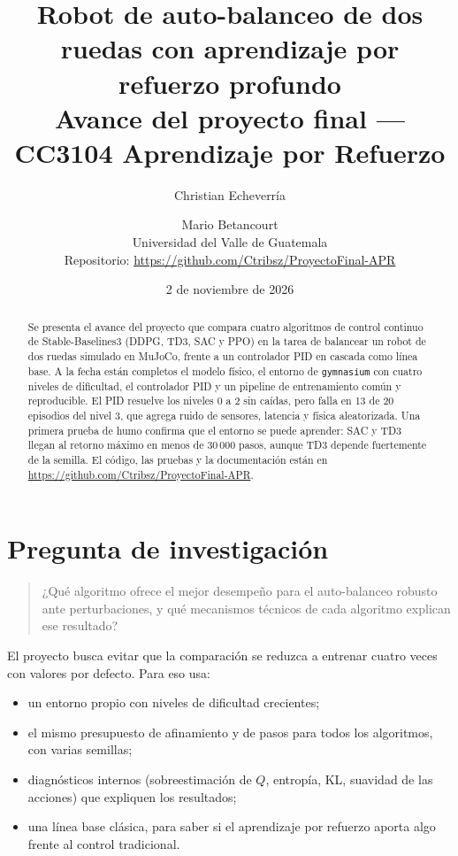 \documentclass[11pt,a4paper]{article}
\title{\textbf{Robot de auto-balanceo de dos ruedas con aprendizaje por refuerzo profundo}\\[4pt]
\large Avance del proyecto final --- CC3104 Aprendizaje por Refuerzo}
\author{Christian Echeverría \and Mario Betancourt\\[2pt]
\small Universidad del Valle de Guatemala\\[2pt]
\small Repositorio: \url{https://github.com/Ctribsz/ProyectoFinal-APR}}
\date{2 de noviembre de 2026}
\newcommand{\code}[1]{\texttt{#1}}
\begin{document}
\maketitle

\begin{abstract}
Se presenta el avance del proyecto que compara cuatro algoritmos de control continuo de Stable-Baselines3 (DDPG, TD3, SAC y PPO) en la tarea de balancear un robot de dos ruedas simulado en MuJoCo, frente a un controlador PID en cascada como línea base. A la fecha están completos el modelo físico, el entorno de \code{gymnasium} con cuatro niveles de dificultad, el controlador PID y un pipeline de entrenamiento común y reproducible. El PID resuelve los niveles 0 a 2 sin caídas, pero falla en 13 de 20 episodios del nivel 3, que agrega ruido de sensores, latencia y física aleatorizada. Una primera prueba de humo confirma que el entorno se puede aprender: SAC y TD3 llegan al retorno máximo en menos de 30\,000 pasos, aunque TD3 depende fuertemente de la semilla. El código, las pruebas y la documentación están en \url{https://github.com/Ctribsz/ProyectoFinal-APR}.
\end{abstract}

\section{Pregunta de investigación}

\begin{quote}
¿Qué algoritmo ofrece el mejor desempeño para el auto-balanceo robusto ante perturbaciones, y qué mecanismos técnicos de cada algoritmo explican ese resultado?
\end{quote}

El proyecto busca evitar que la comparación se reduzca a entrenar cuatro veces con valores por defecto. Para eso usa:
\begin{itemize}
  \item un entorno propio con niveles de dificultad crecientes;
  \item el mismo presupuesto de afinamiento y de pasos para todos los algoritmos, con varias semillas;
  \item diagnósticos internos (sobreestimación de $Q$, entropía, KL, suavidad de las acciones) que expliquen los resultados;
  \item una línea base clásica, para saber si el aprendizaje por refuerzo aporta algo frente al control tradicional.
\end{itemize}
\end{document}
